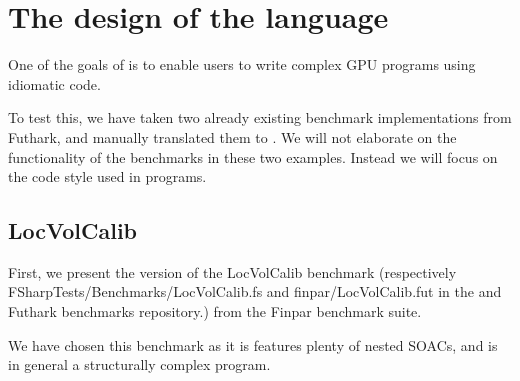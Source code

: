 





















\section{The design of the \fshark{} language}
\label{sec:fsharklanguageeval}
One of the goals of \fshark{} is to enable users to write complex GPU programs
using idiomatic \fsharp{} code.

To test this, we have taken two already existing benchmark implementations from
Futhark, and manually translated them to \fshark{}.
We will not elaborate on the functionality of the benchmarks in these two
examples. Instead we will focus on the code style used in \fshark{} programs.

\subsection{LocVolCalib}
\label{subsec:locvolcalib}
First, we present the \fshark{} version of the LocVolCalib benchmark (respectively
FSharpTests/Benchmarks/LocVolCalib.fs and finpar/LocVolCalib.fut in the
\fshark{} and Futhark benchmarks repository.) from the Finpar\cite{finpar}
benchmark suite.

We have chosen this benchmark as it is features plenty of nested SOACs, and is
in general a structurally complex program.

